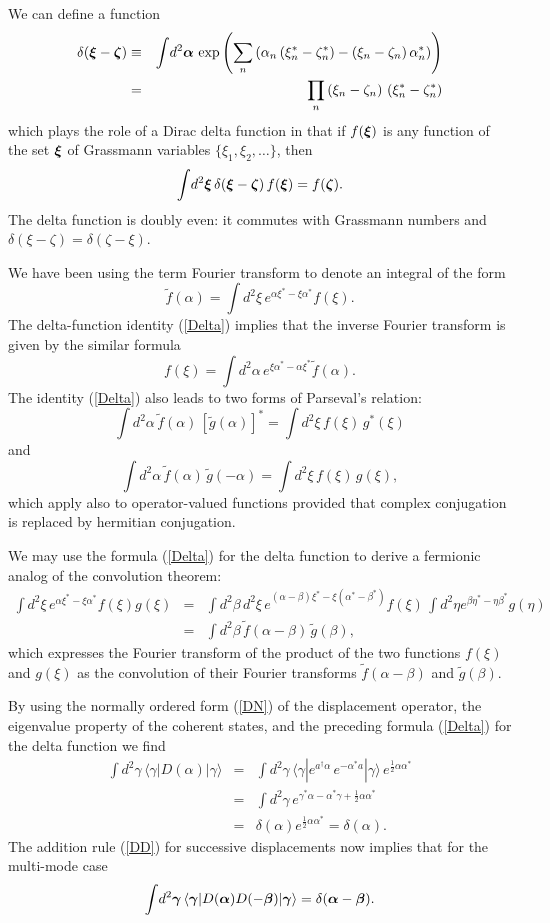 \documentclass[12pt]{article}
\def\beq{\begin{equation}}
\def\eeq{\end{equation}}
\def\bea{\begin{eqnarray}}
\def\eea{\end{eqnarray}}
\def\a{\alpha}
\def\ba{{\mbox{\boldmath$\alpha$}}}
\def\sa{\alpha^*}
\def\ad{a^\dgr}
\def\b{\beta}
\def\bb{{\mbox{\boldmath$\beta$}}}
\def\sb{\beta^*}
\def\c{\gamma}
\def\bc{{\mbox{\boldmath$\gamma$}}}
\def\sc{\gamma^*}
\def\d{\delta}
\def\z{\zeta}
\def\bz{{\mbox{\boldmath$\zeta$}}}
\def\sz{\zeta^*}
\def\x{\xi}
\def\bx{{\mbox{\boldmath$\xi$}}}
\def\xs{\xi^*}
\def\nn{\nonumber}
\def\dgr{\dagger}
\def\shalf{\scriptstyle{\frac{1}{2}}}
\def\G{Grassmann }
\begin{document}
We can define a function
\bea
\d ( \bx - \bz ) & \equiv & 
\int \! d^2 \ba \,
\exp \left( \sum_n \left(
\a_n \left( \xs_n - \sz_n \right)
- \left( \x _n - \z_n \right) \sa_n \right) \right) \label {Delta} \\
& = & \mbox{}
\prod_n 
\left( \x_n - \z _n \right)
\, \left( \xs _n - \sz _n \right) 
\label {delta}
\eea
which plays the role of a Dirac delta function
in that if $ f ( \bx ) $
is any function of the set $ \bx $ of 
Grassmann variables $ \{ \x_1, \x_2, \dots \} $,
then
\beq
\int \! d^2 \bx \, \d ( \bx - \bz ) \, f ( \bx ) 
= f ( \bz ) . 
\label {why delta}
\eeq 
The delta function is doubly even: it commutes with
\G numbers and $ \d ( \x - \z ) = \d ( \z - \x ) $.
\par
We have been using the term Fourier transform
to denote an integral of the form
\beq
\tilde f ( \a ) = \int \! d^2\x \, e^{ \a \xs - \x \sa } f ( \x ) .
\label {defFT}
\eeq
The delta-function identity (\ref {Delta})
implies that the inverse Fourier transform
is given by the similar formula
\beq
f ( \x ) = \int \! d^2\a \, e^{ \x \sa - \a \xs } \tilde f ( \a ) .
\label {defIFT}
\eeq
The identity (\ref {Delta}) also leads to two forms
of Parseval's relation:
\beq
\int \! d^2\a \, \tilde f ( \a ) \, \left[ \tilde g( \a ) \right]^*
= \int \! d^2\x \, f ( \x ) \, g^*( \x ) 
\label {Par1}
\eeq
and
\beq
\int \! d^2\a \, \tilde f ( \a ) \, \tilde g( - \a ) 
= \int \! d^2\x \, f ( \x ) \, g( \x ) ,
\label {Par2}
\eeq
which apply also to operator-valued functions 
provided that complex conjugation is replaced by
hermitian conjugation.
\par
We may use the formula (\ref {Delta}) for the delta function
to derive a fermionic analog of the convolution theorem:
\bea
\int \! d^2 \x \, 
e^{ \a \xs - \x \sa } 
f( \x ) g ( \x ) 
\! & = \! & \int \! d^2\b \,  d^2 \x \,
e^{ ( \a - \b ) \xs - \x ( \sa - \sb ) }
f( \x ) \, \int \! d^2 \eta e^{ \b \eta^* - \eta \sb }g ( \eta ) \nn\\
\! & = & \! \int \! d^2\b \, \tilde f( \a - \b ) \, \tilde g( \b ) ,
\label {convo}
\eea
which expresses the Fourier transform of the product
of the two functions $ f( \x ) $ and $ g ( \x ) $ as
the convolution of their Fourier transforms
$ \tilde f( \a - \b ) $ and $ \tilde g( \b )$. 
\par
By using 
the normally ordered form (\ref {DN}) of the displacement operator, 
the eigenvalue property of the coherent states,
and the preceding formula (\ref {Delta}) for the delta function
we find
\bea
\int \! d^2\c \, \langle \c | D( \a ) | \c \rangle
& = & \int \! d^2\c \, 
\langle \c | e^{ \ad \a }
\, e^{  - \sa a } | \c \rangle
\, e ^{ \shalf \a \sa } \nn\\
& = & \int \! d^2\c \,
e^{ \sc \a - \sa \c +  \shalf \a \sa } \nn\\
& = & \d( \a ) e ^{ \shalf \a \sa } = \d( \a ) .
\label {del1} 
\eea
The addition rule (\ref {DD}) for successive displacements
now implies that for the multi-mode case
\beq
\int \! d^2\bc \, \langle \bc | D( \ba ) D( - \bb ) | \bc \rangle
= \d ( \ba - \bb ) .
\label {del2}
\eeq
\end{document}
